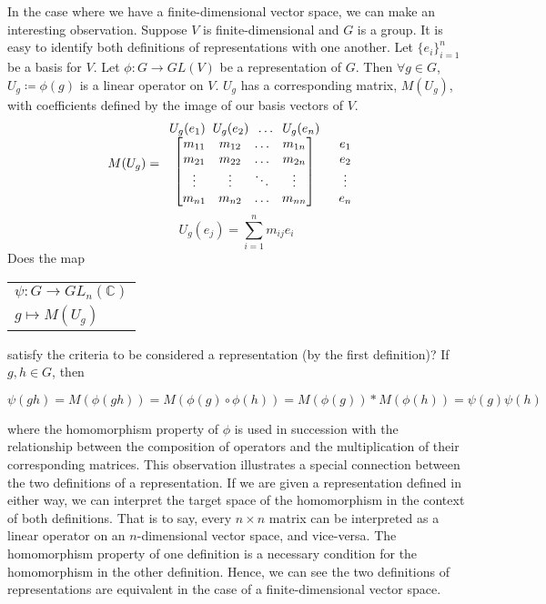 \begin{remark}
	In the case where we have a finite-dimensional vector space, we can make an interesting observation. Suppose $V$ is finite-dimensional and $G$ is a group. It is easy to identify both definitions of representations with one another. Let $\{e_i\}_{i=1}^n$ be a basis for $V$. Let $\phi : G \rightarrow GL(V)$ be a representation of $G$. Then $\forall g \in G$, $U_g\coloneq\phi(g)$ is a linear operator on $V$. $U_g$ has a corresponding matrix, $M(U_g)$, with coefficients defined by the image of our basis vectors of $V$.
$$M(U_g) = \begin{array}{c c}
			U_g(e_1) \hspace{2mm} U_g(e_2) \hspace{2mm} \hdots \hspace{2mm}  U_g(e_n) & \\
			\begin{bmatrix}
				m_{11} & m_{12} & \hdots & m_{1n}\\
				m_{21} & m_{22} & \hdots & m_{2n} \\
				\vdots & \vdots & \ddots & \vdots\\
				m_{n1} & m_{n2} & \hdots & m_{nn}\\
			\end{bmatrix}
			&
			\begin{array}{c}
				e_1\\
				e_2\\
				\vdots\\
				e_n\\
			\end{array}
		\end{array}$$
$$U_g(e_j) = \sum_{i=1}^n m_{ij}e_i$$
\renewcommand{\arraystretch}{0.5}
Does the map \begin{tabular}{l}
			$\psi:G\rightarrow GL_n(\mathbb{C})$\\
			\hspace{6mm}$g\mapsto M(U_g)$
       		 \end{tabular}
satisfy the criteria to be considered a representation (by the first definition)? If $g,h \in G$, then

	$$\psi(gh) = M(\phi(gh)) = M(\phi(g)\circ \phi(h)) = M(\phi(g))*M(\phi(h)) = \psi(g)\psi(h)$$

\noindent where the homomorphism property of $\phi$ is used in succession with the relationship between the composition of operators and the multiplication of their corresponding matrices. This observation illustrates a special connection between the two definitions of a representation. If we are given a representation defined in either way, we can interpret the target space of the homomorphism in the context of both definitions. That is to say, every $n\times n$ matrix can be interpreted as a linear operator on an $n$-dimensional vector space, and vice-versa. The homomorphism property of one definition is a necessary condition for the homomorphism in the other definition. Hence, we can see the two definitions of representations are equivalent in the case of a finite-dimensional vector space.
\end{remark}


